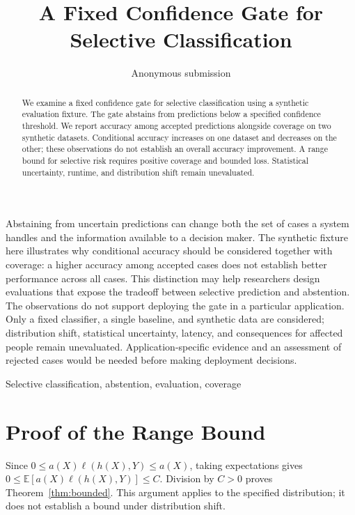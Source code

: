 \documentclass[journal]{IEEEtai}
\title{A Fixed Confidence Gate for Selective Classification}
\author{Anonymous submission}
\begin{document}
\maketitle
\begin{abstract}
We examine a fixed confidence gate for selective classification using a synthetic
evaluation fixture. The gate abstains from predictions below a specified confidence
threshold. We report accuracy among accepted predictions alongside coverage on two
synthetic datasets. Conditional accuracy increases on one dataset and decreases on
the other; these observations do not establish an overall accuracy improvement.
A range bound for selective risk requires positive coverage and bounded loss.
Statistical uncertainty, runtime, and distribution shift remain unevaluated.
\end{abstract}
\begin{IEEEImpStatement}
Abstaining from uncertain predictions can change both the set of cases a system
handles and the information available to a decision maker. The synthetic fixture
here illustrates why conditional accuracy should be considered together with
coverage: a higher accuracy among accepted cases does not establish better
performance across all cases. This distinction may help researchers design
evaluations that expose the tradeoff between selective prediction and abstention.
The observations do not support deploying the gate in a particular application.
Only a fixed classifier, a single baseline, and synthetic data are considered;
distribution shift, statistical uncertainty, latency, and consequences for affected
people remain unevaluated. Application-specific evidence and an assessment of
rejected cases would be needed before making deployment decisions.
\end{IEEEImpStatement}
\begin{IEEEkeywords}Selective classification, abstention, evaluation, coverage\end{IEEEkeywords}


\appendix
\section{Proof of the Range Bound}\label{app:proof}
Since $0\leq a(X)\ell(h(X),Y)\leq a(X)$, taking expectations gives
$0\leq\mathbb{E}[a(X)\ell(h(X),Y)]\leq C$. Division by $C>0$ proves
Theorem~\ref{thm:bounded}. This argument applies to the specified distribution;
it does not establish a bound under distribution shift.
\end{document}
